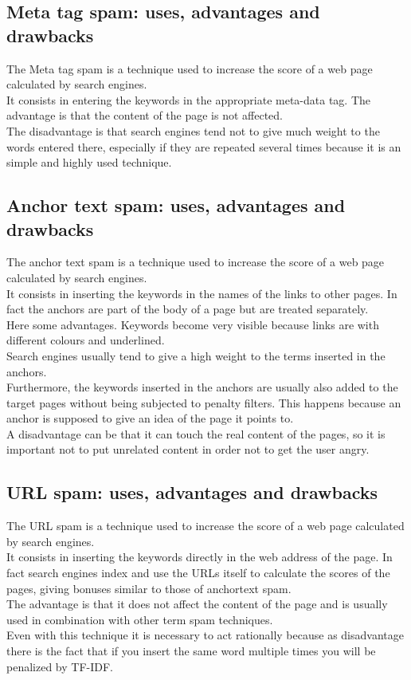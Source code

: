 \subsection{Meta tag spam: uses, advantages and drawbacks}
The Meta tag spam is a technique used to increase the score of a web page calculated
by search engines.\\
It consists in entering the keywords in the
appropriate meta-data tag. The advantage is that the content of
the page is not affected.\\
The disadvantage is that search engines tend not to give much weight
to the words entered there, especially if they are repeated several times
because it is an simple and highly used technique.

\subsection{Anchor text spam: uses, advantages and drawbacks}
The anchor text spam is a technique used to increase the score of a web page calculated
by search engines.\\
It consists in inserting the keywords in the names of the links to
other pages. In fact the anchors are part of the body of a page but are
treated separately.\\
Here some advantages. Keywords become very visible because links are
with different colours and underlined.\\
Search engines usually tend to give a high
weight to the terms inserted in the anchors.\\ Furthermore, the keywords
inserted in the anchors are usually also added to the target pages
without being subjected to penalty filters. This happens because an
anchor is supposed to give an idea of the page it points to.\\
A disadvantage can be that it can touch the real content of the pages, so
it is important not to put unrelated content in order not to get the user
angry.

\subsection{URL spam: uses, advantages and drawbacks}
The URL spam is a technique used to increase the score of a web page calculated
by search engines.\\
It consists in inserting the keywords directly in the web address
of the page. In fact search engines index and use the URLs itself
to calculate the scores of the pages, giving bonuses similar to those
of anchortext spam.\\
The advantage is that it does not affect the content of the page
and is usually used in combination with other term spam techniques.\\
Even with this technique it is necessary to act rationally because as disadvantage
there is the fact that
if you insert the same word multiple times you will be penalized by TF-IDF.

